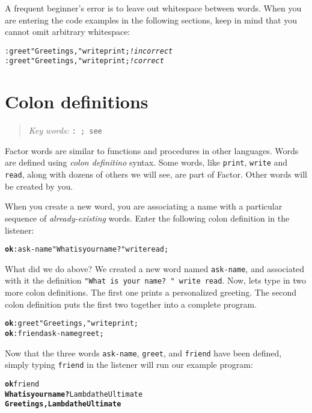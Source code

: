 \documentclass[english]{book}
\newcommand{\chapkeywords}[1]{%
\begin{quote}
\emph{Key words:} \texttt{#1}
\end{quote}
}
\begin{document}
A frequent beginner's error is to leave out whitespace between words. When you are entering the code examples in the following sections, keep in mind that you cannot omit arbitrary whitespace:

\begin{alltt}
:greet "Greetings, " write print; \emph{! incorrect}
: greet "Greetings, " write print ; \emph{! correct}
\end{alltt}

\section{Colon definitions}

\chapkeywords{:~; see}
\index{\texttt{:}}
\index{\texttt{;}}

Factor words are similar to functions and procedures in other languages. Words are defined using \emph{colon definitino} syntax. Some words, like \texttt{print}, \texttt{write} and  \texttt{read}, along with dozens of others we will see, are part of Factor. Other words will be created by you.

When you create a new word, you are associating a name with a particular sequence of \emph{already-existing} words. Enter the following colon definition in the listener:

\begin{alltt}
\textbf{ok} : ask-name "What is your name? " write read ;
\end{alltt}

What did we do above? We created a new word named \texttt{ask-name}, and associated with it the definition \texttt{"What is your name? " write read}. Now, lets type in two more colon definitions. The first one prints a personalized greeting. The second colon definition puts the first two together into a complete program.

\begin{alltt}
\textbf{ok} : greet "Greetings, " write print ;
\textbf{ok} : friend ask-name greet ;
\end{alltt}

Now that the three words \texttt{ask-name}, \texttt{greet}, and \texttt{friend} have been defined, simply typing \texttt{friend} in the listener will run our example program:

\begin{alltt}
\textbf{ok} friend
\textbf{What is your name? }Lambda the Ultimate
\textbf{Greetings, Lambda the Ultimate}
\end{alltt}
\end{document}
